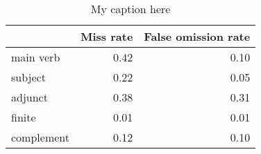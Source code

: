 \begin{table}[!ht]
\centering
\begin{tabular}{lrr}
\toprule
{} &  Miss rate &  False omission rate \\
\midrule
main verb  &       0.42 &                 0.10 \\
subject    &       0.22 &                 0.05 \\
adjunct    &       0.38 &                 0.31 \\
finite     &       0.01 &                 0.01 \\
complement &       0.12 &                 0.10 \\
\bottomrule
\end{tabular}
\caption{My caption here}
\label{tab:unit-elements-mood-exact-errors}
\end{table}